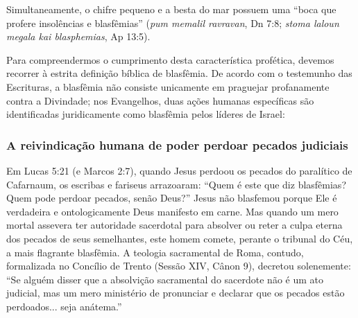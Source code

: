 Simultaneamente, o chifre pequeno e a besta do mar possuem uma ``boca que profere insolências e blasfêmias'' (\textit{pum memalil ravravan}, Dn 7:8; \textit{stoma laloun megala kai blasphemias}, Ap 13:5).

Para compreendermos o cumprimento desta característica profética, devemos recorrer à estrita definição bíblica de blasfêmia. De acordo com o testemunho das Escrituras, a blasfêmia não consiste unicamente em praguejar profanamente contra a Divindade; nos Evangelhos, duas ações humanas específicas são identificadas juridicamente como blasfêmia pelos líderes de Israel:


\subsubsection*{A reivindicação humana de poder perdoar pecados judiciais}
Em Lucas 5:21 (e Marcos 2:7), quando Jesus perdoou os pecados do paralítico de Cafarnaum, os escribas e fariseus arrazoaram: ``Quem é este que diz blasfêmias? Quem pode perdoar pecados, senão Deus?'' Jesus não blasfemou porque Ele é verdadeira e ontologicamente Deus manifesto em carne. Mas quando um mero mortal assevera ter autoridade sacerdotal para absolver ou reter a culpa eterna dos pecados de seus semelhantes, este homem comete, perante o tribunal do Céu, a mais flagrante blasfêmia. A teologia sacramental de Roma, contudo, formalizada no Concílio de Trento (Sessão XIV, Cânon 9), decretou solenemente: ``Se alguém disser que a absolvição sacramental do sacerdote não é um ato judicial, mas um mero ministério de pronunciar e declarar que os pecados estão perdoados... seja anátema.''

